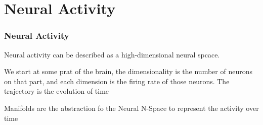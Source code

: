 \documentclass{beamer}
\begin{document}

\section{Neural Activity}
\begin{frame}
\frametitle{\textbf{Neural Activity} }

Neural activity can be described as a high-dimensional neural spcace.


We start at some prat of the brain, the dimensionality is the number of neurons on that part, and each dimension is the firing rate of those neurons. The trajectory is the evolution of time 

Manifolds are the abstraction fo the Neural N-Space to represent the activity over time






\end{frame}
\end{document}
